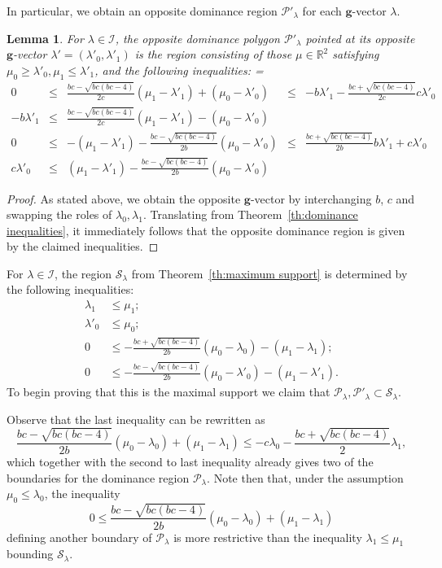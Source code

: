 \documentclass{amsart}
\newtheorem{lemma}[theorem]{Lemma}
\numberwithin{theorem}{section}
\newcommand{\bfg}{\boldsymbol{g}}
\newcommand{\cI}{\mathcal{I}}
\newcommand{\cP}{\mathcal{P}}
\newcommand{\cS}{\mathcal{S}}
\newcommand{\RR}{\mathbb{R}}
\begin{document}
  In particular, we obtain an opposite dominance region $\cP'_\lambda$ for each $\bfg$-vector $\lambda$.
  \begin{lemma}
    For $\lambda\in\cI$, the opposite dominance polygon $\cP'_\lambda$ pointed at its opposite $\bfg$-vector $\lambda'=(\lambda'_0,\lambda'_1)$ is the region consisting of those $\mu\in\RR^2$ satisfying $\mu_0 \geq \lambda'_0, \mu_1 \leq\lambda'_1$, and the following inequalities:
    {
      \everymath={\displaystyle}
      \def\arraystretch{2.8}
      \[
        \begin{array}{rcccl}
          0 & \leq & \frac{b c-\sqrt{b c (b c-4)}}{2 c}(\mu_1-\lambda'_1)+(\mu_0-\lambda'_0) & \leq & -b\lambda'_1-\frac{b c+\sqrt{b c (b c-4)}}{2c}c\lambda'_0
          \\
          -b\lambda'_1 & \leq & \frac{b c-\sqrt{b c (b c-4)}}{2 c}(\mu_1-\lambda'_1)-(\mu_0-\lambda'_0)
          \\
          0 & \leq &  -(\mu_1-\lambda'_1)-\frac{b c-\sqrt{b c (b c-4)}}{2 b}(\mu_0-\lambda'_0) & \leq & \frac{b c+\sqrt{b c (b c-4)}}{2b}b\lambda'_1+c\lambda'_0
          \\
          c \lambda'_0 & \leq & (\mu_1-\lambda'_1) - \frac{b c-\sqrt{b c (b c-4)}}{2 b} (\mu_0-\lambda'_0)
        \end{array}
      \]
    }
  \end{lemma}
  \begin{proof}
    As stated above, we obtain the opposite $\bfg$-vector by interchanging $b$, $c$ and swapping the roles of $\lambda_0,\lambda_1$.
    Translating from Theorem~\ref{th:dominance inequalities}, it immediately follows that the opposite dominance region is given by the claimed inequalities.
  \end{proof}

  For $\lambda\in\cI$, the region $\cS_\lambda$ from Theorem~\ref{th:maximum support} is determined by the following inequalities:
  \begin{align*}
    \lambda_1 &\leq \mu_1;\\
    \lambda'_0 &\leq \mu_0;\\
    0 &\leq -\frac{b c+\sqrt{b c (b c-4)}}{2 b}(\mu_0-\lambda_0)-(\mu_1-\lambda_1);\\
    0 &\leq -\frac{b c-\sqrt{b c (b c-4)}}{2 b}(\mu_0-\lambda'_0) -(\mu_1-\lambda'_1).
  \end{align*}
  To begin proving that this is the maximal support we claim that $\cP_\lambda,\cP'_\lambda\subset\cS_\lambda$.

  Observe that the last inequality can be rewritten as
  \[ \frac{b c-\sqrt{b c (b c-4)}}{2 b}(\mu_0-\lambda_0) + (\mu_1-\lambda_1) \leq -c\lambda_0 - \frac{b c + \sqrt{b c (b c-4)}}{2 } \lambda_1,\]
  which together with the second to last inequality already gives two of the boundaries for the dominance region $\cP_\lambda$.
  Note then that, under the assumption $\mu_0\leq\lambda_0$, the inequality 
  \[0 \leq \frac{b c-\sqrt{b c (b c-4)}}{2 b}(\mu_0-\lambda_0)+(\mu_1-\lambda_1)\]
  defining another boundary of $\cP_\lambda$ is more restrictive than the inequality $\lambda_1\leq\mu_1$ bounding $\cS_\lambda$.
\end{document}
